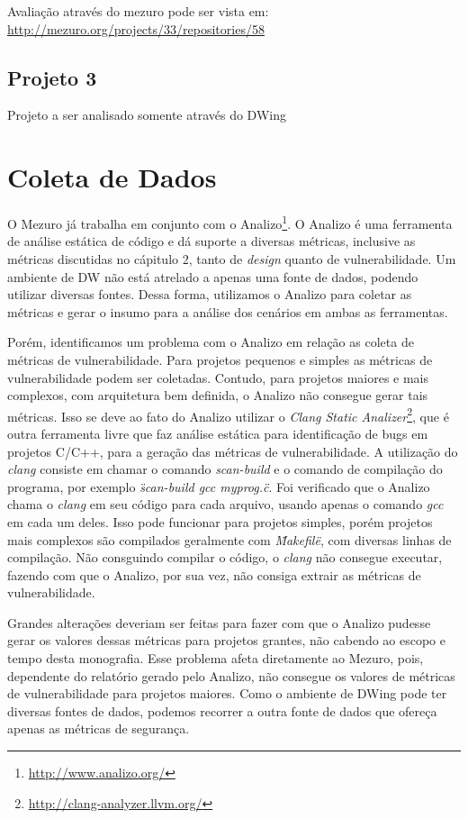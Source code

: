 Avaliação através do mezuro pode ser vista em: \url{http://mezuro.org/projects/33/repositories/58}

\subsection{Projeto 3}
\label{}

Projeto a ser analisado somente através do DWing


\section{Coleta de Dados}
\label{data-colect}

O Mezuro já trabalha em conjunto com o Analizo\footnote{\url{http://www.analizo.org/}}. O Analizo é uma ferramenta de análise estática de código e dá suporte a diversas métricas, inclusive as métricas discutidas no cápitulo 2, tanto de \emph{design} quanto de vulnerabilidade. Um ambiente de DW não está atrelado a apenas uma fonte de dados, podendo utilizar diversas fontes. Dessa forma, utilizamos o Analizo para coletar as métricas e gerar o insumo para a análise dos cenários em ambas as ferramentas.

Porém, identificamos um problema com o Analizo em relação as coleta de métricas de vulnerabilidade. Para projetos pequenos e simples as métricas de vulnerabilidade podem ser coletadas.  Contudo, para projetos maiores e mais complexos, com arquitetura bem definida, o Analizo não consegue gerar tais métricas. Isso se deve ao fato do Analizo utilizar o \emph{Clang Static Analizer}\footnote{\url{http://clang-analyzer.llvm.org/}}, que é outra ferramenta livre que faz análise estática para identificação de bugs em projetos C/C++, para a geração das métricas de vulnerabilidade. A utilização do \emph{clang} consiste em chamar o comando \emph{scan-build}  e o comando de compilação do programa, por exemplo \emph{\"scan-build gcc myprog.c\"}. Foi verificado que o Analizo chama o \emph{clang} em seu código para cada arquivo, usando apenas o comando \emph{gcc} em cada um deles. Isso pode funcionar para projetos simples, porém projetos mais complexos são compilados geralmente com \emph{\"Makefile\"}, com diversas linhas de compilação. Não consguindo compilar o código, o \emph{clang} não consegue executar, fazendo com que o Analizo, por sua vez, não consiga extrair as métricas de vulnerabilidade. 

Grandes alterações deveriam ser feitas para fazer com que o Analizo pudesse gerar os valores dessas métricas para projetos grantes, não cabendo ao escopo e tempo desta monografia. Esse problema afeta diretamente ao Mezuro, pois, dependente do relatório gerado pelo Analizo, não consegue os valores de métricas de vulnerabilidade para projetos maiores. Como o ambiente de DWing pode ter diversas fontes de dados, podemos recorrer a outra fonte de dados que ofereça apenas as métricas de segurança.


